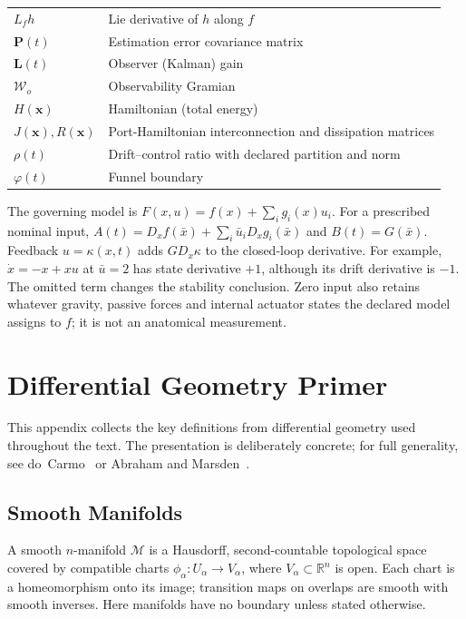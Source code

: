 \documentclass[10pt,letterpaper,openany]{book}
\theoremstyle{plain}
\theoremstyle{definition}
\theoremstyle{remark}
\renewcommand{\R}{\mathbb{R}}
\renewcommand{\vec}[1]{\bm{#1}}
\renewcommand{\mat}[1]{\mathbf{#1}}
\newcommand{\x}{\vec{x}}
\begin{document}
\begin{center}
\begin{tabular}{lp{10cm}}
$L_f h$ & Lie derivative of $h$ along $f$ \\
$\mat{P}(t)$ & Estimation error covariance matrix \\
$\mat{L}(t)$ & Observer (Kalman) gain \\
$\mathcal{W}_o$ & Observability Gramian \\
$H(\x)$ & Hamiltonian (total energy) \\
$J(\x), R(\x)$ & Port-Hamiltonian interconnection and dissipation matrices \\
$\rho(t)$ & Drift--control ratio with declared partition and norm \\
$\varphi(t)$ & Funnel boundary \\
\bottomrule
\end{tabular}
\end{center}

The governing model is $F(x,u)=f(x)+\sum_i g_i(x)u_i$. For a prescribed nominal input,
$A(t)=D_xf(\bar x)+\sum_i\bar u_iD_xg_i(\bar x)$ and $B(t)=G(\bar x)$.
Feedback $u=\kappa(x,t)$ adds $G D_x\kappa$ to the closed-loop derivative.
For example, $\dot x=-x+xu$ at $\bar u=2$ has state derivative $+1$, although
its drift derivative is $-1$. The omitted term changes the stability conclusion.
Zero input also retains whatever gravity, passive forces and internal actuator
states the declared model assigns to $f$; it is not an anatomical measurement.

\makeatletter
\@mainmattertrue
\makeatother
\appendix

\chapter{Differential Geometry Primer}
\label{app:diffgeo}

This appendix collects the key definitions from differential geometry used throughout the
text. The presentation is deliberately concrete; for full generality, see
do~Carmo~\cite{doCarmo1992} or Abraham and Marsden~\cite{AbrahamMarsden1978}.

\section{Smooth Manifolds}

A smooth $n$-manifold $\mathcal M$ is a Hausdorff, second-countable topological
space covered by compatible charts $\phi_\alpha:U_\alpha\to V_\alpha$, where
$V_\alpha\subset\R^n$ is open. Each chart is a homeomorphism onto its image;
transition maps on overlaps are smooth with smooth inverses. Here manifolds
have no boundary unless stated otherwise.
\end{document}
